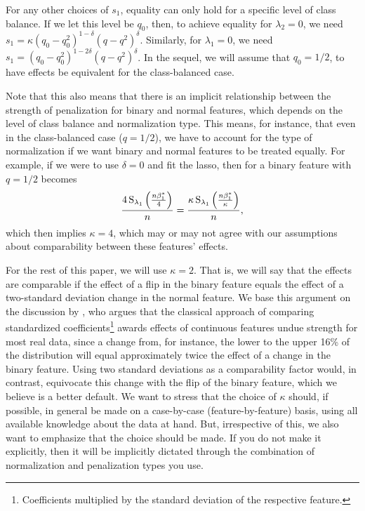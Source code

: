 For any other choices of \(s_1\), equality can only hold for a specific level of class balance. If we let this level be \(q_0\), then, to achieve equality for \(\lambda_2 = 0\), we need \(s_1 =\kappa (q_0 - q_0^2)^{1 - \delta}(q - q^2)^\delta\). Similarly, for \(\lambda_1 = 0\), we need \(s_1 = (q_0 - q_0^2)^{1 - 2\delta} (q - q^2)^\delta\). In the sequel, we will assume that \(q_0 = 1/2\), to have effects be equivalent for the class-balanced case.

Note that this also means that there is an implicit relationship between the strength of penalization for binary and normal features, which depends on the level of class balance and normalization type. This means, for instance, that even in the class-balanced case (\(q = 1/2\)), we have to account for the type of normalization if we want binary and normal features to be treated equally. For example, if we were to use \(\delta=0\) and fit the lasso, then  for a binary feature with \(q=1/2\) becomes
\[
  \frac{4\operatorname{S}_{\lambda_1}\left(\frac{n\beta_1^*}{4}\right)}{n}               = \frac{\kappa \operatorname{S}_{\lambda_1}\left(\frac{n\beta_1^*}{\kappa} \right)}{n},
\]
which then implies \(\kappa = 4\), which may or may not agree with our assumptions about comparability between these features' effects.

For the rest of this paper, we will use \(\kappa = 2\). That is, we will say that the effects are comparable if the effect of a flip in the binary feature equals the effect of a two-standard deviation change in the normal feature. We base this argument on the discussion by \citet{gelman2008}, who argues that the classical approach of comparing standardized coefficients\footnote{Coefficients multiplied by the standard deviation of the respective feature.} awards effects of continuous features undue strength for most real data, since a change from, for instance, the lower to the upper 16\% of the distribution will equal approximately twice the effect of a change in the binary feature. Using two standard deviations as a comparability factor would, in contrast, equivocate this change with the flip of the binary feature, which we believe is a better default.
We want to stress that the choice of \(\kappa\) should, if possible, in general be made on a case-by-case (feature-by-feature) basis, using all available knowledge about the data at hand. But, irrespective of this, we also want to emphasize that the choice should be made. If you do not make it explicitly, then it will be implicitly dictated through the combination of normalization and penalization types you use.

